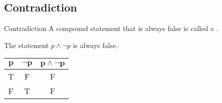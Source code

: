 \documentclass[../notes.tex]{subfiles}
\begin{document}
			\subsection{Contradiction}
				\begin{definition}[width=0.75\textwidth]{Contradiction}
					A compound statement that is always false is called a .
				\end{definition}
				\begin{example}[width=0.55\textwidth]
					The statement $p \land \lnot p$ is always false.
					\begin{center}
						\begin{tabular}{| c c | c |}
							\hline
							$\mathbf{p}$ & $\mathbf{\lnot p}$ & $\mathbf{p \land \lnot p}$\\
							\hline
							T & F & F\\
							F & T & F\\
							\hline
						\end{tabular}
					\end{center}
				\end{example}
\end{document}
